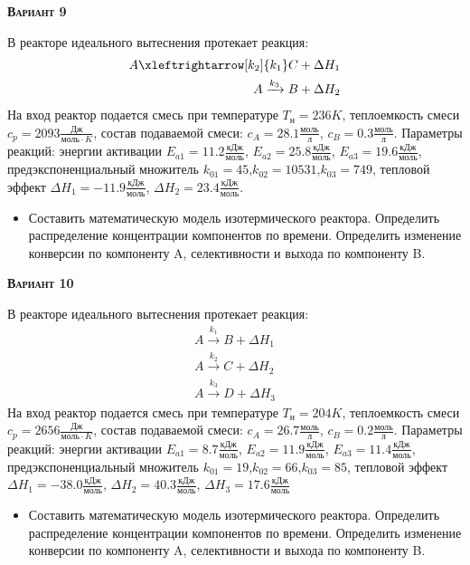 \textsc{\textbf{Вариант 9}}

 В реакторе идеального вытеснения протекает реакция: \begin{equation*} \begin{aligned} A \xleftrightarrow[k_2]{k_1} C + \Delta H_1 \\ A \xrightarrow{k_3} B + \Delta H_2 \end{aligned} \end{equation*}                              На вход  реактор подается смесь при температуре $ T_{н} =  236 K$, теплоемкость смеси $c_p= 2093 \frac{Дж}{моль \cdot K}$, состав подаваемой смеси: $c_A=28.1 \frac{моль}{л}$, $c_B=0.3 \frac{моль}{л}$. Параметры реакций: энергии активации $E_{a1}=11.2 \frac{кДж}{моль}$, $E_{a2}=25.8  \frac{кДж}{моль}$, $E_{a3}=19.6  \frac{кДж}{моль}$, предэкспоненциальный множитель $k_{01}=        45$,$k_{02}=     10531$,$k_{03}=       749$, тепловой эффект $\Delta H_1= -11.9  \frac{кДж}{моль}$, $\Delta H_2=23.4 \frac{кДж}{моль}$.\begin{itemize} \item Составить математическую модель изотермического реактора. Определить распределение концентрации компонентов по времени. Определить изменение конверсии по компоненту A, селективности и выхода по компоненту B. \end{itemize}

\textsc{\textbf{Вариант 10}}

 В реакторе идеального вытеснения протекает реакция: \begin{equation*} \begin{aligned} A \xrightarrow{k_1} B + \Delta H_1 \\ A \xrightarrow{k_2} C + \Delta H_2 \\ A \xrightarrow{k_3} D + \Delta H_3 \end{aligned} \end{equation*} На вход  реактор подается смесь при температуре $ T_{н} =  204 K$, теплоемкость смеси $c_p= 2656 \frac{Дж}{моль \cdot K}$, состав подаваемой смеси: $c_A=26.7 \frac{моль}{л}$, $c_B=0.2 \frac{моль}{л}$. Параметры реакций: энергии активации $E_{a1}= 8.7 \frac{кДж}{моль}$, $E_{a2}=11.9  \frac{кДж}{моль}$, $E_{a3}=11.4  \frac{кДж}{моль}$, предэкспоненциальный множитель $k_{01}=        19$,$k_{02}=        66$,$k_{03}=        85$, тепловой эффект $\Delta H_1= -38.0 \frac{кДж}{моль}$, $\Delta H_2=40.3 \frac{кДж}{моль}$, $\Delta H_3 = 17.6 \frac{кДж}{моль}$\begin{itemize} \item Составить математическую модель изотермического реактора. Определить распределение концентрации компонентов по времени. Определить изменение конверсии по компоненту A, селективности и выхода по компоненту B. \end{itemize}


